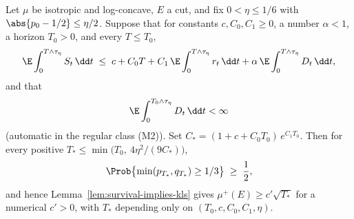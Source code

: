 \documentclass[../main.tex]{subfiles}
\begin{document}
\begin{lemma}
\label{lem:sol-constant-supply-consumption}
Let $\mu$ be isotropic and log-concave, $E$ a cut, and fix $0<\eta\le1/6$ with
$\abs{p_0-1/2}\le\eta/2$.  Suppose that for constants $c,C_0,C_1\ge0$, a number
$\alpha<1$, a horizon $T_0>0$, and every $T\le T_0$,
\begin{equation}
\label{eq:sol-constant-carleson}
  \E\int_0^{T\wedge\tau_\eta}S_t\,\dd t
  \;\le\;c+C_0T
   +C_1\,\E\int_0^{T\wedge\tau_\eta}r_t\,\dd t
   +\alpha\,\E\int_0^{T\wedge\tau_\eta}D_t\,\dd t ,
\end{equation}
and that
\begin{equation}
\label{eq:sol-apriori-finite}
  \E\int_0^{T_0\wedge\tau_\eta}D_t\,\dd t<\infty
\end{equation}
(automatic in the regular class (M2)).  Set
$C_*=(1+c+C_0T_0)\,e^{C_1T_0}$.  Then for every positive
$T_*\le\min\bigl(T_0,\ 4\eta^2/(9C_*)\bigr)$,
\[
  \Prob\bigl\{\min(p_{T_*},q_{T_*})\ge1/3\bigr\}\;\ge\;\frac12 ,
\]
and hence Lemma~\ref{lem:survival-implies-kls} gives
$\mu^+(E)\ge c'\sqrt{T_*}$ for a numerical $c'>0$, with $T_*$ depending only on
$(T_0,c,C_0,C_1,\eta)$.
\end{lemma}
\end{document}
